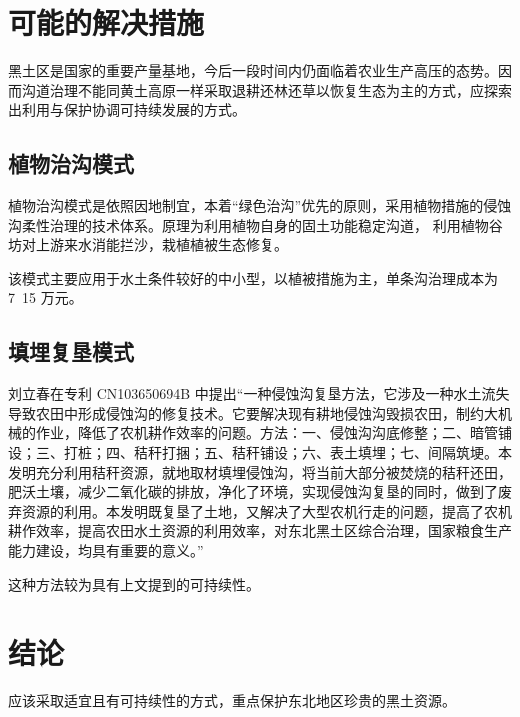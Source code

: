 \documentclass{nle}
\begin{document}
\section{可能的解决措施}

黑土区是国家的重要产量基地，今后一段时间内仍面临着农业生产高压的态势。因而沟道治理不能同黄土高原一样采取退耕还林还草以恢复生态为主的方式，应探索出利用与保护协调可持续发展的方式。

\subsection{植物治沟模式}

植物治沟模式是依照因地制宜，本着“绿色治沟”优先的原则，采用植物措施的侵蚀沟柔性治理的技术体系。原理为利用植物自身的固土功能稳定沟道， 利用植物谷坊对上游来水消能拦沙，栽植植被生态修复。

该模式主要应用于水土条件较好的中小型，以植被措施为主，单条沟治理成本为 7~15 万元。

\subsection{填埋复垦模式}

刘立春在专利 CN103650694B 中提出“一种侵蚀沟复垦方法，它涉及一种水土流失导致农田中形成侵蚀沟的修复技术。它要解决现有耕地侵蚀沟毁损农田，制约大机械的作业，降低了农机耕作效率的问题。方法：一、侵蚀沟沟底修整；二、暗管铺设；三、打桩；四、秸秆打捆；五、秸秆铺设；六、表土填埋；七、间隔筑埂。本发明充分利用秸秆资源，就地取材填埋侵蚀沟，将当前大部分被焚烧的秸秆还田，肥沃土壤，减少二氧化碳的排放，净化了环境，实现侵蚀沟复垦的同时，做到了废弃资源的利用。本发明既复垦了土地，又解决了大型农机行走的问题，提高了农机耕作效率，提高农田水土资源的利用效率，对东北黑土区综合治理，国家粮食生产能力建设，均具有重要的意义。”

这种方法较为具有上文提到的可持续性。

\section{结论}

应该采取适宜且有可持续性的方式，重点保护东北地区珍贵的黑土资源。
\end{document}

